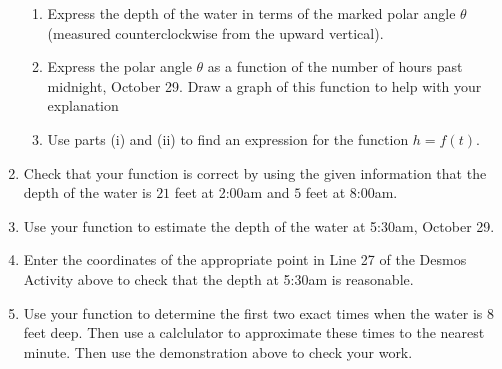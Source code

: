 \documentclass{ximera}
\begin{document}
\begin{example}
\begin{explanation}
\begin{enumerate}
\begin{enumerate}
\item Express the depth of the water in terms of the marked polar angle $\theta$ (measured counterclockwise from the upward vertical).

\item Express the polar angle $\theta$ as a function of the number of hours past midnight, October 29. Draw a graph of this function to help with your explanation

\item Use parts (i) and (ii) to find an expression for the function $h=f(t)$.
\end{enumerate}


\item Check that your function is correct by using the given information that the depth of the water is $21$ feet at 2:00am and $5$ feet at 8:00am.


\item Use your function to estimate the depth of the water at 5:30am, October 29.

\item Enter the coordinates of the appropriate point in Line 27 of the Desmos Activity above to check that the depth at 5:30am is reasonable.

\item Use your function to determine the first two exact times when the water is $8$ feet deep. Then use a calclulator to approximate these times to the nearest minute. Then use the demonstration above to check your work.

\end{enumerate}

\end{explanation}

\end{example}
\end{document}
